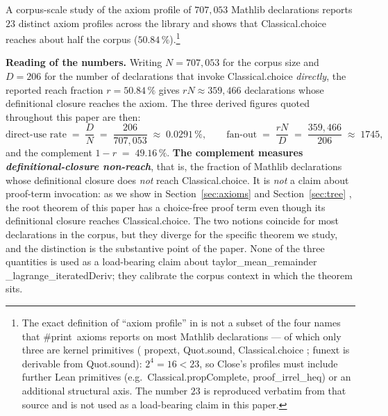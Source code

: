 \documentclass[11pt,reqno]{amsart}
\begin{document}
\noindent A corpus-scale study of the axiom profile of $707{,}053$ Mathlib
declarations \cite{close2026axiom} reports $23$ distinct axiom profiles
across the library and shows that \textsf{Classical\allowbreak.choice}
reaches about half the corpus ($50.84\,\%$).\footnote{%
The exact definition of ``axiom profile'' in \cite{close2026axiom} is not a
subset of the four names that \textsf{\#print\ axioms} reports on most
Mathlib declarations --- of which only three are kernel primitives (\textsf{%
propext}, \textsf{Quot\allowbreak.sound}, \textsf{Classical\allowbreak.choice%
}; \textsf{funext} is derivable from \textsf{Quot\allowbreak.sound}): $%
2^{4}=16<23$, so Close's profiles must include further Lean primitives
(e.g.\ \textsf{Classical\allowbreak.propComplete}, \textsf{%
proof\allowbreak\_irrel\allowbreak\_heq}) or an additional structural axis.
The number $23$ is reproduced verbatim from that source and is not used as a
load-bearing claim in this paper.}

\smallskip\noindent\textbf{Reading of the numbers.} Writing $N = 707{,}053$
for the corpus size and $D = 206$ for the number of declarations that invoke 
\textsf{Classical\allowbreak.choice} \emph{directly}, the reported reach
fraction $r = 50.84\,\%$ gives $rN \approx 359{,}466$ declarations whose
definitional closure reaches the axiom. The three derived figures quoted
throughout this paper are then: 
\begin{equation*}
\text{direct-use rate} \;=\;\frac{D}{N} \;=\;\frac{206}{707{,}053}
\;\approx\;0.0291\,\%, \qquad \text{fan-out} \;=\;\frac{rN}{D} \;=\;\frac{359%
{,}466}{206} \;\approx\;1745,
\end{equation*}
and the complement $1 - r \;=\; 49.16\,\%$. \textbf{The complement measures 
\emph{definitional-closure non-reach}}, that is, the fraction of Mathlib
declarations whose definitional closure does \emph{not} reach \textsf{%
Classical\allowbreak.choice}. It is \emph{not} a claim about proof-term
invocation: as we show in Section~\ref{sec:axioms} and Section~\ref{sec:tree}%
, the root theorem of this paper has a choice-free proof term even though
its definitional closure reaches \textsf{Classical\allowbreak.choice}. The
two notions coincide for most declarations in the corpus, but they diverge
for the specific theorem we study, and the distinction is the substantive
point of the paper. None of the three quantities is used as a load-bearing
claim about \textsf{taylor\allowbreak\_mean\allowbreak\_remainder\allowbreak%
\_lagrange\allowbreak \_iterated\allowbreak Deriv}; they calibrate the
corpus context in which the theorem sits.
\end{document}
